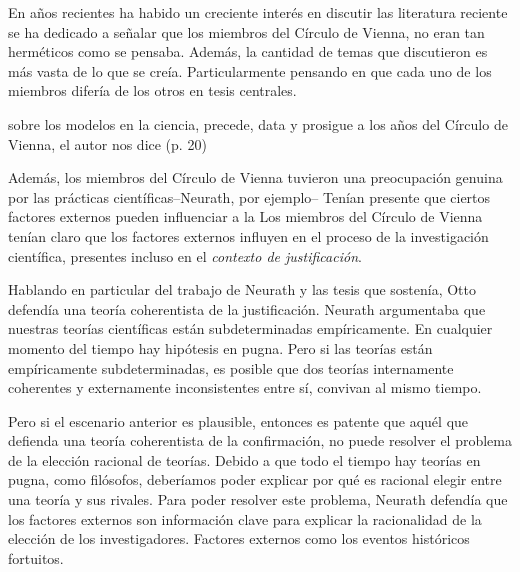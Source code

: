 \noindent En años recientes ha habido un creciente interés en discutir las
literatura reciente se ha dedicado a señalar que los miembros del Círculo
de Vienna, no eran tan herméticos como se pensaba. Además, la cantidad de
temas que discutieron es más vasta de lo que se creía. Particularmente
pensando en que cada uno de los miembros difería de los otros en tesis
centrales.

sobre los modelos en la ciencia, precede, data y prosigue a los años del
Círculo de Vienna, el autor nos dice  (p. 20)

Además, los miembros del Círculo de Vienna tuvieron una preocupación
genuina por las prácticas científicas--Neurath, por ejemplo-- Tenían
presente que ciertos factores externos pueden influenciar a la
 Los
miembros del Círculo de Vienna tenían claro que los factores externos
influyen en el proceso de la investigación científica, presentes incluso en
el \emph{contexto de justificación}.

Hablando en particular del trabajo de Neurath y las tesis que sostenía,
Otto defendía una teoría coherentista de la justificación. Neurath
argumentaba que nuestras teorías científicas están subdeterminadas
empíricamente. En cualquier momento del tiempo hay hipótesis en pugna. Pero
si las teorías están empíricamente subdeterminadas, es posible que dos
teorías internamente coherentes y externamente inconsistentes entre sí,
convivan al mismo tiempo.

Pero si el escenario anterior es plausible, entonces es patente que aquél
que defienda una teoría coherentista de la confirmación, no puede resolver
el problema de la elección racional de teorías. Debido a que todo el tiempo
hay teorías en pugna, como filósofos, deberíamos poder explicar por qué es
racional elegir entre una teoría y sus rivales. Para poder resolver este
problema, Neurath defendía que los factores externos son información clave
para explicar la racionalidad de la elección de los investigadores.
Factores externos como los eventos históricos fortuitos.

